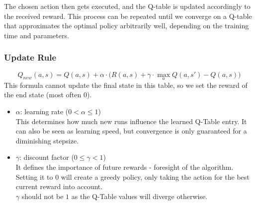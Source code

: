 The chosen action then gets executed, and the Q-table is updated accordingly to the received reward. This process can be repeated until we converge on a Q-table that approximates the optimal policy arbitrarily well, depending on the training time and parameters.

\subsubsection{Update Rule} 
\begin{equation}
	Q_{new}(a, s) = Q(a, s) + \alpha \cdot \bigg(R(a, s) + \gamma \cdot \max_a Q(a, s') - Q(a, s)\bigg)
\end{equation}
This formula cannot update the final state in this table, so we set the reward of the end state (most often $0$).

\begin{itemize}
	\setlength\itemsep{0.5em}
	\item $\alpha$: learning rate ($0 < \alpha \leq 1$)\\
	This determines how much new runs influence the learned Q-Table entry. It can also be seen as learning speed, but convergence is only guaranteed for a diminishing stepsize. 
	\item $\gamma$: discount factor ($0 \leq \gamma < 1$)\\
	It defines the importance of future rewards - foresight of the algorithm.\\
	Setting it to $0$ will create a greedy policy, only taking the action for the best current reward into account.\\
	$\gamma$ should not be $1$ as the Q-Table values will diverge otherwise.
\end{itemize}

